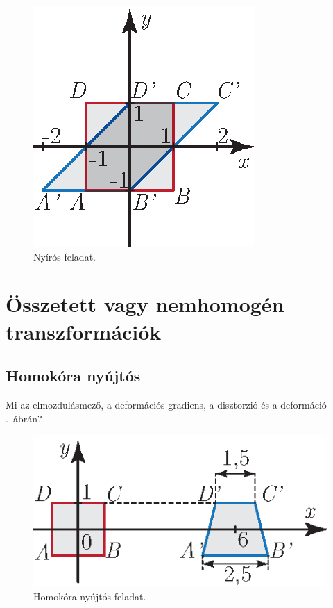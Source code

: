 \documentclass[12pt,a4paper]{scrartcl}
\begin{document}
\begin{figure}[htb] 
\centering    
\includegraphics[scale=1]{figs/nyiras_feladat.eps}
\caption{Nyírós feladat.}
\label{fig:nyiras_feladat}
\end{figure}
\FloatBarrier

\section{Összetett vagy nemhomogén transzformációk}
\subsection{Homokóra nyújtós}
Mi az elmozdulásmező, a deformációs gradiens, a disztorzió és a deformáció .\ ábrán?

\begin{figure}[htb] 
\centering    
\includegraphics[scale=1]{figs/homokora_nyujtas_feladat.eps}
\caption{Homokóra nyújtós feladat.}
\label{fig:homokora_nyujtas_feladat}
\end{figure}
\FloatBarrier
\end{document}
